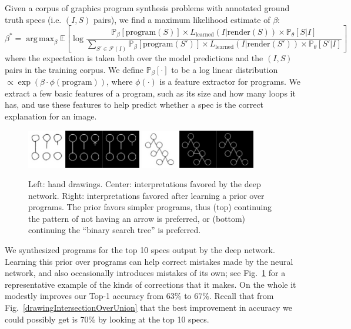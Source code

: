 \documentclass{article}
\DeclareMathOperator*{\argmax}{arg\,max} %
\newcommand{\expect}{\mathds{E}} %
\newcommand{\probability}{\mathds{P}} %
\theoremstyle{definition}
\begin{document}
Given a corpus of graphics program synthesis problems with annotated ground truth specs (i.e. $(I,S)$ pairs),
we find a maximum likelihood estimate of $\beta$:
\begin{equation}
  \beta^* = \argmax_{\beta} \expect \left[ \log \frac{\probability_{\beta} [\text{program}(S)]\times L_{\text{learned}}(I|\text{render}(S))\times \probability_\theta[S|I]}{\sum_{S'\in \mathcal{F}(I)} \probability_{\beta} [\text{program}(S')]\times L_{\text{learned}}(I|\text{render}(S'))\times \probability_\theta[S'|I]} \right]
\end{equation}
where the expectation is taken both over the model predictions and the
$(I,S)$ pairs in the training corpus.  We define $\probability_{\beta}
[\cdot]$ to be a log linear distribution $\propto \exp
(\beta\cdot \phi(\text{program}))$, where $\phi(\cdot)$ is a feature
extractor for programs.  We extract a few basic features of a
program, such as its size and how many loops it has, and use these
features to help predict whether a spec is the correct explanation
for an image.
\begin{figure}\vspace{-0.5cm}
  \includegraphics[width = 5cm]{figures/programSuccess7.png}
  \includegraphics[width = 5cm]{figures/programSuccess16.png}
  \caption{Left: hand drawings. Center: interpretations favored by the deep network. Right: interpretations favored after learning a prior over programs. The prior favors  simpler programs, thus (top) continuing the pattern of not having an arrow is preferred, or (bottom) continuing the ``binary search tree'' is preferred.}\vspace{-1cm}\label{exampleOfProgramCorrectingMistake}
  \end{figure}
We synthesized programs for the top 10 specs
output by the deep network.  Learning this prior over programs can
help correct mistakes made by the neural network, and also
occasionally introduces mistakes of its own; see
Fig.~\ref{exampleOfProgramCorrectingMistake} for a representative
example of the kinds of corrections that it makes. On the whole
it modestly improves our Top-1 accuracy from 63\% to 67\%.  Recall that
from Fig.~\ref{drawingIntersectionOverUnion} that the best improvement
in accuracy we could possibly get is 70\% by looking at the top 10 specs. 
\end{document}
